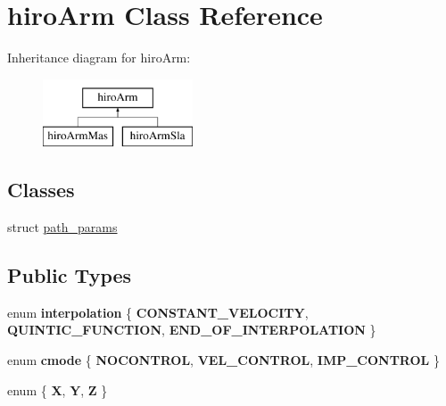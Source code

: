 \hypertarget{classhiroArm}{\section{hiro\-Arm Class Reference}
\label{classhiroArm}
}
Inheritance diagram for hiro\-Arm\-:\begin{figure}[H]
\begin{center}
\leavevmode
\includegraphics[height=2.000000cm]{classhiroArm}
\end{center}
\end{figure}
\subsection*{Classes}
\begin{DoxyCompactItemize}
\item 
struct \hyperlink{structhiroArm_1_1path__params}{path\-\_\-params}
\end{DoxyCompactItemize}
\subsection*{Public Types}
\begin{DoxyCompactItemize}
\item 
enum {\bfseries interpolation} \{ {\bfseries C\-O\-N\-S\-T\-A\-N\-T\-\_\-\-V\-E\-L\-O\-C\-I\-T\-Y}, 
{\bfseries Q\-U\-I\-N\-T\-I\-C\-\_\-\-F\-U\-N\-C\-T\-I\-O\-N}, 
{\bfseries E\-N\-D\-\_\-\-O\-F\-\_\-\-I\-N\-T\-E\-R\-P\-O\-L\-A\-T\-I\-O\-N}
 \}
\item 
enum {\bfseries cmode} \{ {\bfseries N\-O\-C\-O\-N\-T\-R\-O\-L}, 
{\bfseries V\-E\-L\-\_\-\-C\-O\-N\-T\-R\-O\-L}, 
{\bfseries I\-M\-P\-\_\-\-C\-O\-N\-T\-R\-O\-L}
 \}
\item 
enum \{ {\bfseries X}, 
{\bfseries Y}, 
{\bfseries Z}
 \}
\end{DoxyCompactItemize}
